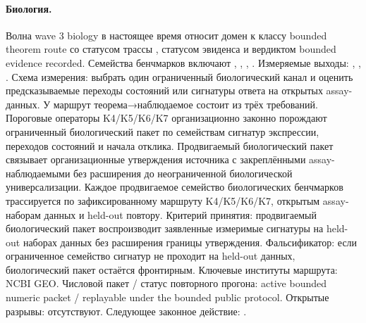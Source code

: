 \paragraph{Биология.}
Волна wave 3 biology в настоящее время относит домен к классу bounded theorem route со статусом трассы , статусом эвиденса  и вердиктом bounded evidence recorded.
Семейства бенчмарков включают , \allowbreak {}, \allowbreak {}, \allowbreak {}.
Измеряемые выходы: , \allowbreak {}, \allowbreak {}.
Схема измерения: выбрать один ограниченный биологический канал и оценить предсказываемые переходы состояний или сигнатуры ответа на открытых assay-данных.
У маршрут теорема→наблюдаемое состоит из трёх требований. Пороговые операторы K4/K5/K6/K7 организационно законно порождают ограниченный биологический пакет по семействам сигнатур экспрессии, переходов состояний и начала отклика. Продвигаемый биологический пакет связывает организационные утверждения источника с закреплёнными assay-наблюдаемыми без расширения до неограниченной биологической универсализации. Каждое продвигаемое семейство биологических бенчмарков трассируется по зафиксированному маршруту K4/K5/K6/K7, открытым assay-наборам данных и held-out повтору.
Критерий принятия: продвигаемый биологический пакет воспроизводит заявленные измеримые сигнатуры на held-out наборах данных без расширения границы утверждения.
Фальсификатор: если ограниченное семейство сигнатур не проходит на held-out данных, биологический пакет остаётся фронтирным.
Ключевые институты маршрута: NCBI GEO.
Числовой пакет / статус повторного прогона: active bounded numeric packet / replayable under the bounded public protocol.
Открытые разрывы: отсутствуют.
Следующее законное действие: .

